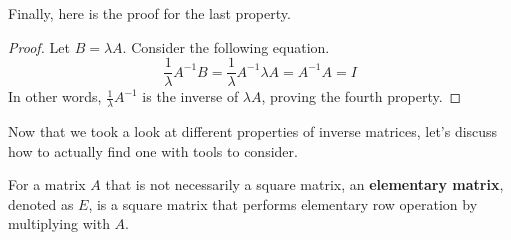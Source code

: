 \documentclass[../main.tex]{subfiles}
\begin{document}
Finally, here is the proof for the last property.

\begin{proof}
Let $B = \lambda A$. Consider the following equation.
\[
\frac{1}{\lambda} A^{-1} B
= \frac{1}{\lambda} A^{-1} \lambda A
= A^{-1} A
= I
\]
In other words, $\frac{1}{\lambda} A^{-1}$ is the inverse of
$\lambda A$, proving the fourth property.
\end{proof}

Now that we took a look at different properties of inverse matrices,
let's discuss how to actually find one with tools to consider.

\begin{definition}
For a matrix $A$ that is not necessarily a square matrix, an
\textbf{elementary matrix}, denoted as $E$, is a square matrix that
performs elementary row operation by multiplying with $A$.
\end{definition}
\end{document}
